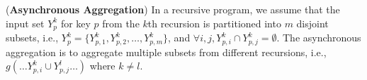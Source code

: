 \begin{definition}
	\label{def:asyncaggre}
	(\textbf{Asynchronous Aggregation}) In a recursive program, we assume that the input set $Y_{p}^k$ for key $p$ from the $k$th recursion is partitioned into $m$ disjoint subsets, i.e., $Y_{p}^k=\{Y_{p,1}^k,Y_{p,2}^k,\ldots,Y_{p,m}^k\}$, and $\forall i,j, Y_{p,i}^k\cap Y_{p,j}^k=\emptyset$. The asynchronous aggregation is to aggregate multiple subsets from different recursions, i.e., $g(\ldots Y_{p,i}^k\cup Y_{p,j}^{l}\ldots)$ where $k\neq l$.
\end{definition}

